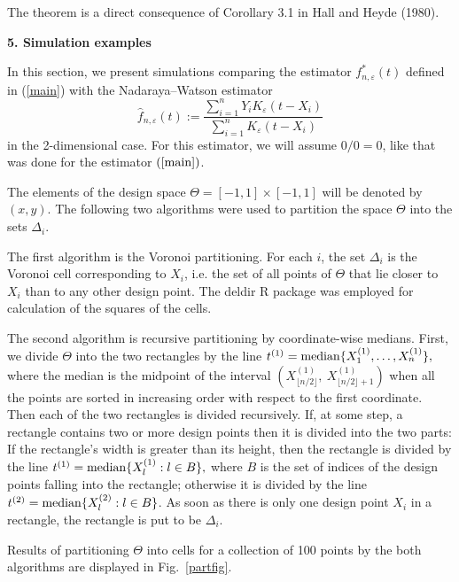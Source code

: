 \documentclass[12pt]{article}
\theoremstyle{remark}
\begin{document}
The theorem is a direct consequence of Corollary 3.1 in Hall and Heyde (1980).


\begin{center}
{\bf 5. Simulation examples}
\end{center}


In this section, we present simulations comparing the estimator $f^*_{n,\varepsilon}(t)$
defined in (\ref{main})
with the Nadaraya--Watson estimator
$$
\hat f_{n,\varepsilon}(t):=
\frac{\sum_{i=1}^nY_{i}K_{\varepsilon}(t-X_{i})}{\sum_{i=1}^nK_{\varepsilon}(t-X_{i})}
$$
in the 2-dimensional case.
For this estimator, we will assume $0/0=0$, like that was done for the estimator  $(\ref{main})$.


The elements of the design space $\Theta = [-1,1]\times [-1,1]$ will be denoted by $(x,y)$.
The following two algorithms were used to partition the space $\Theta$ into the sets $\Delta_i$.

The first algorithm is the Voronoi partitioning.
For each $i$, the set $\Delta_i$ is the Voronoi cell corresponding to $X_i$, i.e. the set of all points of $\Theta$ that lie closer to $X_i$ than to any other design point. The {\sf deldir} R package was employed for calculation of the squares of the cells.

The second algorithm is recursive partitioning  by coordinate-wise medians.
First, we divide $\Theta$ into the two rectangles by the line
$t^{(1)} = {\rm median} \{X_1^{(1)},\dots,X_n^{(1)} \},$
where the median is the midpoint of the interval
$\left(X_{\lfloor n/2 \rfloor}^{(1)},\  X_{\lfloor n/2 \rfloor+1}^{(1)} \right)$
when all the points are sorted
in increasing order with respect to the first coordinate.
Then each of the two rectangles is divided recursively. If, at some step,
a rectangle contains two or more design points then it is divided into the two parts:
If the rectangle's width is greater than its height, then the rectangle
is divided by
the line $t^{(1)}= {\rm median} \{X_{l}^{(1)}: l\in  B\},$ where $B$ is the set of indices
of the design points falling into the rectangle;
otherwise it is divided  by
the line $t^{(2)}= {\rm median} \{X_{l}^{(2)}: l\in  B\}$.
As soon as there is only one design point $X_i$ in a rectangle, the rectangle is
put to be $\Delta_i$.

Results of partitioning $\Theta$ into cells for a collection of 100 points by the both algorithms are displayed in Fig.~\ref{partfig}.
\end{document}
